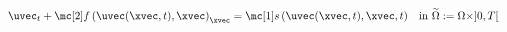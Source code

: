 \begin{defnbox}\nospacing
    \begin{defn}\label{defn:systems_of_conservation_law}
        \begin{align}
          &\uvec_{t}+\flux\left(\uvec(\xvec,t),\xvec\right)_{\xvec}=\sourceterm\left(\uvec(\xvec,t),\xvec,t\right)&&
                    \text{in }\widetilde{\Omega}:=\Omega\times]0,T[\label{eq:system_of_conservation_law}
        \end{align}
    \end{defn}
\end{defnbox}

